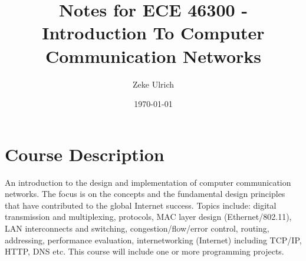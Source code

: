 \documentclass[nobib]{tufte-handout}
\title{Notes for ECE 46300 - Introduction To Computer Communication Networks }
\author{Zeke Ulrich}
\date{\today}
\begin{document}
\maketitle

\tableofcontents

\section{Course Description}
An introduction to the design and implementation of computer communication networks. The focus is on the concepts and the fundamental design principles that have contributed to the global Internet success. Topics include: digital transmission and multiplexing, protocols, MAC layer design (Ethernet/802.11), LAN interconnects and switching, congestion/flow/error control, routing, addressing, performance evaluation, internetworking (Internet) including TCP/IP, HTTP, DNS etc. This course will include one or more programming projects.
\pagebreak

















\end{document}
